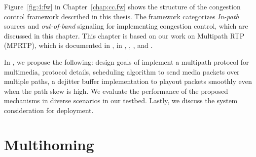 Figure~\ref{fig:4:fw} in Chapter~\ref{chap:cc.fw} shows the structure of the
congestion control framework described in this thesis. The framework
categorizes \emph{In-path} sources and \emph{out-of-band} signaling for
implementing congestion control, which are discussed in this chapter. This
chapter is based on our work on Multipath RTP (MPRTP), which is documented in
, in \cite{draft.mprtp}, \cite{draft.mprtp.sdp},
\cite{Globisch:AsymGrpComm}, and \cite{draft.rtcp.overlay}.

In , we propose the following: design goals of implement a
multipath protocol for multimedia, protocol details, scheduling algorithm to
send media packets over multiple paths, a dejitter buffer implementation to
playout packets smoothly even when the path skew is high. We evaluate the
performance of the proposed mechanisms in diverse scenarios in our testbed.
Lastly, we discuss the system consideration for deployment.

\section{Multihoming}